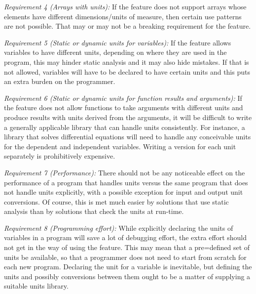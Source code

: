 \documentclass{article}
\begin{document}
\vspace{\baselineskip}
\noindent \emph{Requirement 4 (Arrays with units):}
If the feature does not support arrays whose elements have different dimensions/units of measure, then
certain use patterns are not possible. That may or may not be a breaking requirement for the feature.

\vspace{\baselineskip}
\noindent \emph{Requirement 5 (Static or dynamic units for variables):}
If the feature allows variables to have different units, depending on where they are used in the program, this
may hinder static analysis and it may also hide mistakes. If that is not allowed, variables will have to be
declared to have certain units and this puts an extra burden on the programmer.

\vspace{\baselineskip}
\noindent \emph{Requirement 6 (Static or dynamic units for function results and arguments):}
If the feature does not allow functions to take arguments with different units and produce results with units derived
from the arguments, it will be difficult to write a generally applicable library that can handle units consistently.
For instance, a library that solves differential equations will need to handle any conceivable units for the
dependent and independent variables. Writing a version for each unit separately is prohibitively expensive.

\vspace{\baselineskip}
\noindent \emph{Requirement 7 (Performance):}
There should not be any noticeable effect on the performance of a program that handles units versus the same program
that does not handle units explicitly, with a possible exception for input and output unit conversions. Of course, this
is met much easier by solutions that use static analysis than by solutions that check the units at run-time.

\vspace{\baselineskip}
\noindent \emph{Requirement 8 (Programming effort):}
While explicitly declaring the units of variables in a program will save a lot of debugging effort, the extra effort
should not get in the way of using the feature. This may mean that a pre=defined set of units be available, so that
a programmer does not need to start from scratch for each new program. Declaring the unit for a variable is inevitable,
but defining the units and possibly conversions between them ought to be a matter of supplying a suitable units library.
\end{document}
